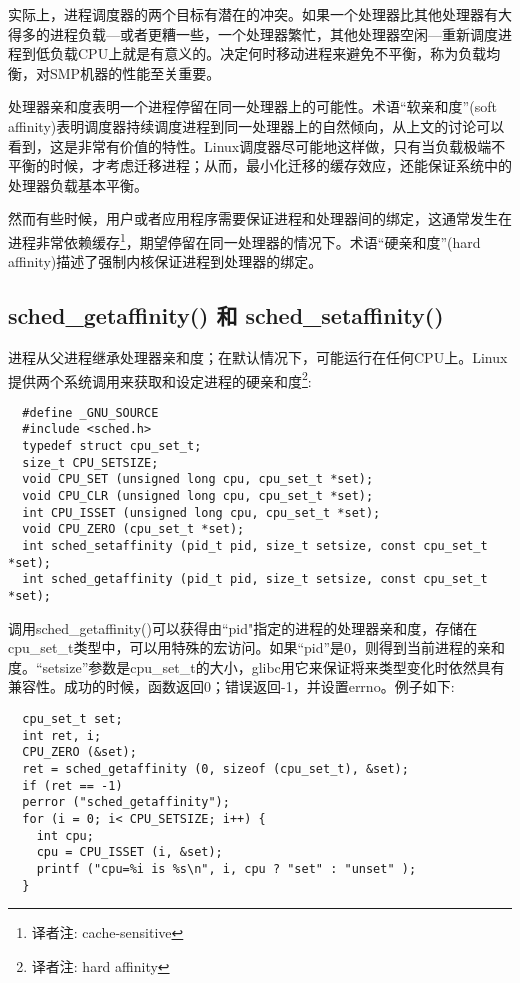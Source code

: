 实际上，进程调度器的两个目标有潜在的冲突。如果一个处理器比其他处理器有大得多的进程负载---或者更糟一些，一个处理器繁忙，其他处理器空闲---重新调度进程到低负载CPU上就是有意义的。决定何时移动进程来避免不平衡，称为负载均衡，对SMP机器的性能至关重要。

处理器亲和度表明一个进程停留在同一处理器上的可能性。术语“软亲和度”(soft affinity)表明调度器持续调度进程到同一处理器上的自然倾向，从上文的讨论可以看到，这是非常有价值的特性。Linux调度器尽可能地这样做，只有当负载极端不平衡的时候，才考虑迁移进程；从而，最小化迁移的缓存效应，还能保证系统中的处理器负载基本平衡。

然而有些时候，用户或者应用程序需要保证进程和处理器间的绑定，这通常发生在进程非常依赖缓存\footnote[3]{译者注: cache-sensitive}，期望停留在同一处理器的情况下。术语“硬亲和度”(hard affinity)描述了强制内核保证进程到处理器的绑定。

\subsection{sched\_getaffinity() 和 sched\_setaffinity()}

进程从父进程继承处理器亲和度；在默认情况下，可能运行在任何CPU上。Linux提供两个系统调用来获取和设定进程的硬亲和度\footnote[3]{译者注: hard affinity}:

\begin{lstlisting}
  #define _GNU_SOURCE
  #include <sched.h>
  typedef struct cpu_set_t;
  size_t CPU_SETSIZE;
  void CPU_SET (unsigned long cpu, cpu_set_t *set);
  void CPU_CLR (unsigned long cpu, cpu_set_t *set);
  int CPU_ISSET (unsigned long cpu, cpu_set_t *set);
  void CPU_ZERO (cpu_set_t *set);
  int sched_setaffinity (pid_t pid, size_t setsize, const cpu_set_t *set);
  int sched_getaffinity (pid_t pid, size_t setsize, const cpu_set_t *set);
\end{lstlisting}

调用sched\_getaffinity()可以获得由``pid"指定的进程的处理器亲和度，存储在cpu\_set\_t类型中，可以用特殊的宏访问。如果“pid”是0，则得到当前进程的亲和度。“setsize”参数是cpu\_set\_t的大小，glibc用它来保证将来类型变化时依然具有兼容性。成功的时候，函数返回0；错误返回-1，并设置errno。例子如下:

\begin{lstlisting}
  cpu_set_t set;
  int ret, i;
  CPU_ZERO (&set);
  ret = sched_getaffinity (0, sizeof (cpu_set_t), &set);
  if (ret == -1)
  perror ("sched_getaffinity");
  for (i = 0; i< CPU_SETSIZE; i++) {
    int cpu;
    cpu = CPU_ISSET (i, &set);
    printf ("cpu=%i is %s\n", i, cpu ? "set" : "unset" );
  }
\end{lstlisting}

